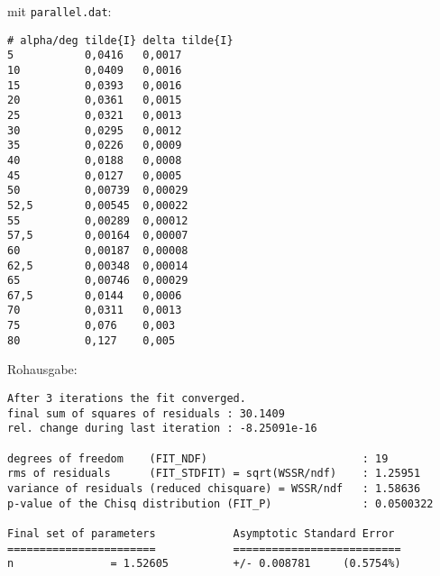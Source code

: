     mit \texttt{parallel.dat}:
    \begin{multicols}{2}
        \begin{verbatim}
# alpha/deg tilde{I} delta tilde{I}
5           0,0416   0,0017
10          0,0409   0,0016
15          0,0393   0,0016
20          0,0361   0,0015
25          0,0321   0,0013
30          0,0295   0,0012
35          0,0226   0,0009
40          0,0188   0,0008
45          0,0127   0,0005
50          0,00739  0,00029
52,5        0,00545  0,00022
55          0,00289  0,00012
57,5        0,00164  0,00007
60          0,00187  0,00008
62,5        0,00348  0,00014
65          0,00746  0,00029
67,5        0,0144   0,0006
70          0,0311   0,0013
75          0,076    0,003
80          0,127    0,005
        \end{verbatim}
    \end{multicols}
    \vspace{-\baselineskip}
    Rohausgabe:
    \begin{verbatim}
After 3 iterations the fit converged.
final sum of squares of residuals : 30.1409
rel. change during last iteration : -8.25091e-16

degrees of freedom    (FIT_NDF)                        : 19
rms of residuals      (FIT_STDFIT) = sqrt(WSSR/ndf)    : 1.25951
variance of residuals (reduced chisquare) = WSSR/ndf   : 1.58636
p-value of the Chisq distribution (FIT_P)              : 0.0500322

Final set of parameters            Asymptotic Standard Error
=======================            ==========================
n               = 1.52605          +/- 0.008781     (0.5754%)
    \end{verbatim}

